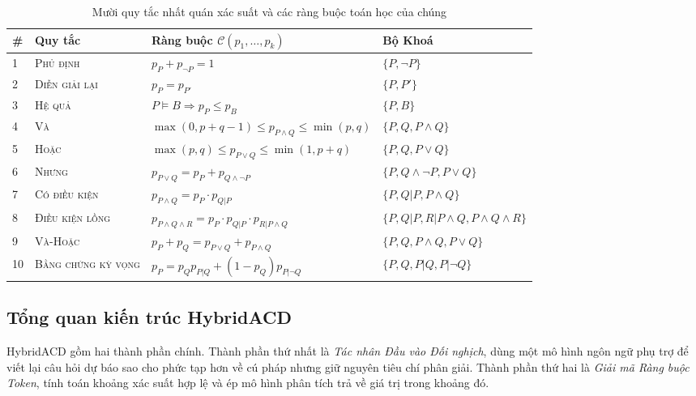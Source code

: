 \documentclass[pdflatex,sn-mathphys-num,oneside]{sn-jnl}
\begin{document}
\begin{table}[htbp]
\caption{Mười quy tắc nhất quán xác suất và các ràng buộc toán học của chúng}
\label{tab:consistency_rules}
\begin{tabular}{@{}llll@{}}
\toprule
\# & Quy tắc & Ràng buộc $\mathcal{C}(p_1, \ldots, p_k)$ & Bộ Khoá \\
\midrule
1 & \textsc{Phủ định}      & $p_P + p_{\neg P} = 1$                          & $\{P, \neg P\}$ \\
2 & \textsc{Diễn giải lại} & $p_P = p_{P'}$                                  & $\{P, P'\}$ \\
3 & \textsc{Hệ quả}        & $P \models B \Rightarrow p_P \leq p_B$          & $\{P, B\}$ \\
4 & \textsc{Và}            & $\max(0,p+q-1) \leq p_{P \wedge Q} \leq \min(p,q)$ & $\{P,Q,P\wedge Q\}$ \\
5 & \textsc{Hoặc}          & $\max(p,q) \leq p_{P \vee Q} \leq \min(1,p+q)$ & $\{P,Q,P\vee Q\}$ \\
6 & \textsc{Nhưng}         & $p_{P \vee Q} = p_P + p_{Q \wedge \neg P}$     & $\{P,Q\wedge\neg P,P\vee Q\}$ \\
7 & \textsc{Có điều kiện}  & $p_{P \wedge Q} = p_P \cdot p_{Q|P}$           & $\{P,Q|P,P\wedge Q\}$ \\
8 & \textsc{Điều kiện lồng}& $p_{P\wedge Q\wedge R} = p_P \cdot p_{Q|P} \cdot p_{R|P\wedge Q}$ & $\{P,Q|P,R|P\wedge Q,P\wedge Q\wedge R\}$ \\
9 & \textsc{Và-Hoặc}       & $p_P + p_Q = p_{P\vee Q} + p_{P\wedge Q}$      & $\{P,Q,P\wedge Q,P\vee Q\}$ \\
10 & \textsc{Bằng chứng kỳ vọng} & $p_P = p_Q p_{P|Q} + (1-p_Q)p_{P|\neg Q}$ & $\{P,Q,P|Q,P|\neg Q\}$ \\
\bottomrule
\end{tabular}
\end{table}

\subsection{Tổng quan kiến trúc HybridACD}

HybridACD gồm hai thành phần chính. Thành phần thứ nhất là \textit{Tác nhân Đầu vào Đối nghịch}, dùng một mô hình ngôn ngữ phụ trợ để viết lại câu hỏi dự báo sao cho phức tạp hơn về cú pháp nhưng giữ nguyên tiêu chí phân giải. Thành phần thứ hai là \textit{Giải mã Ràng buộc Token}, tính toán khoảng xác suất hợp lệ và ép mô hình phân tích trả về giá trị trong khoảng đó.
\end{document}
